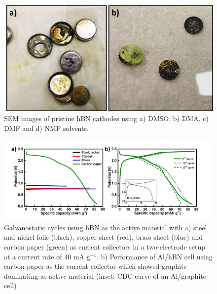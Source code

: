 \begin{figure}[tbh!]
\centering
\includegraphics[width=\textwidth]{Figures/chap7fig/steeleffect}
\caption{SEM images of pristine hBN cathodes using a) DMSO, b) DMA, c) DMF and d) NMP solvents.}
\label{Figures/chap7fig:steeleffect}
\end{figure}
\begin{figure}[tbh!]
\centering
\includegraphics[width=\textwidth]{Figures/chap7fig/hBNCCCDC}
\caption{Galvanostatic cycles using hBN as the active material with a) steel and nickel foils (black), copper sheet (red), brass sheet (blue) and carbon paper (green) as current collectors in a two-electrode setup at a current rate of 40 mA g$^{-1}$. b) Performance of Al/hBN cell using carbon paper as the current collector which showed graphite dominating as active material (inset: CDC curve of an Al/graphite cell) }
\label{Figures/chap7fig:hBNCCCDC}
\end{figure}

